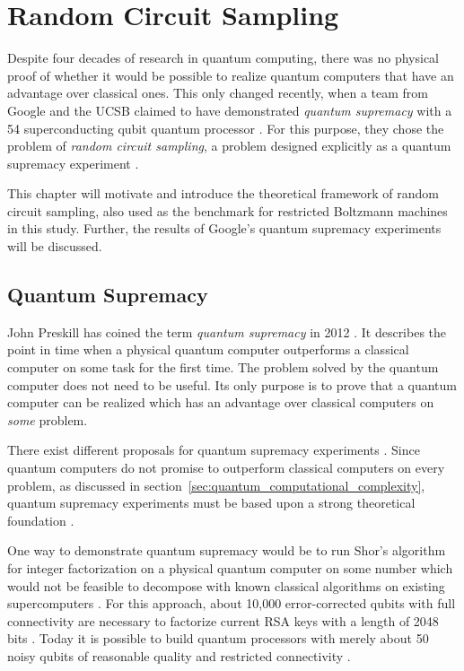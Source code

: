 \chapter{Random Circuit Sampling}
\label{sec:rcs}

Despite four decades
of research in quantum computing, 
there was no physical proof of whether it would be possible to realize quantum computers
that have an advantage over classical ones. This only changed
recently, when a team from Google and the UCSB claimed to have demonstrated \textit{quantum supremacy}
with a 54 superconducting qubit quantum processor \cite{martines2019supremacy}. For this purpose, they
chose the problem of \textit{random circuit sampling}, a problem designed explicitly
as a quantum supremacy experiment \cite{Boixo2018supremacy}.

This chapter will motivate and introduce the theoretical framework of random circuit
sampling, also used as the benchmark for restricted Boltzmann machines in this
study. Further, the results of Google's quantum supremacy experiments will be discussed.

\section{Quantum Supremacy}
\label{sec:quantum_supremacy}

John Preskill has coined the term \textit{quantum supremacy} in 2012
\cite{preskill2012quantum}. It describes the point in time when a physical quantum computer
outperforms a classical computer on some task for the first time. The problem
solved by the quantum computer does not need to be useful. Its only purpose is
to prove that a quantum computer can be realized which has an advantage over
classical computers on \textit{some} problem.

There exist different proposals for quantum supremacy
experiments \cite{shor1997factorisation, aaronson2013boson, Boixo2018supremacy}. Since quantum computers do not promise to outperform classical
computers on every problem, as discussed in section~\ref{sec:quantum_computational_complexity}, 
quantum supremacy experiments must be based upon a strong theoretical foundation \cite{Bernstein93quantumcomplexity}.

One way to demonstrate quantum supremacy would be to run Shor's
algorithm for integer factorization \cite{shor1997factorisation} on a physical quantum computer on some number which would not be feasible
to decompose with known classical algorithms on existing supercomputers \cite{martinlopez2011experimental}. 
For this approach, about 10,000 error-corrected qubits with full connectivity are necessary to factorize current 
RSA keys with a length of 2048 bits \cite{Barker15nistspecial,shor1997factorisation}. Today it is possible to
build quantum processors with merely about 50 noisy qubits of reasonable quality and restricted connectivity \cite{martines2019supremacy}.

